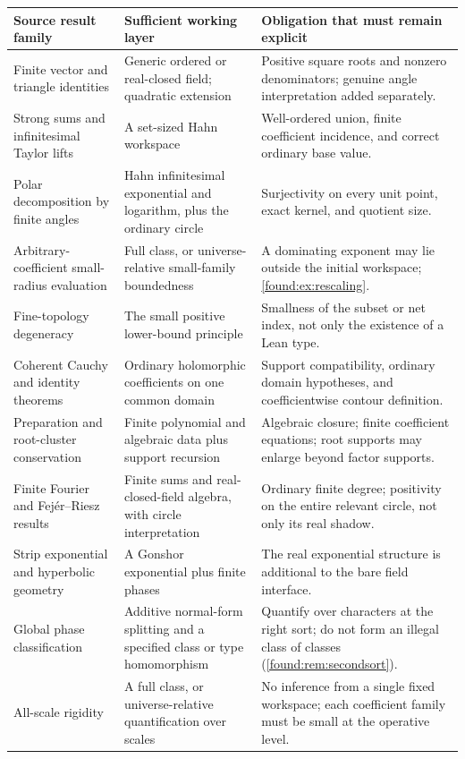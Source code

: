 \documentclass[11pt,letterpaper]{article}
\numberwithin{equation}{section}
\theoremstyle{definition}
\theoremstyle{remark}
\begin{document}
\begin{longtable}{@{}P{0.25\textwidth}P{0.32\textwidth}P{0.35\textwidth}@{}}
\toprule
Source result family & Sufficient working layer & Obligation that must remain explicit\\
\midrule\endhead
Finite vector and triangle identities & Generic ordered or real-closed field; quadratic extension & Positive square roots and nonzero denominators; genuine angle interpretation added separately.\\[0.4em]
Strong sums and infinitesimal Taylor lifts & A set-sized Hahn workspace & Well-ordered union, finite coefficient incidence, and correct ordinary base value.\\[0.4em]
Polar decomposition by finite angles & Hahn infinitesimal exponential and logarithm, plus the ordinary circle & Surjectivity on every unit point, exact kernel, and quotient size.\\[0.4em]
Arbitrary-coefficient small-radius evaluation & Full class, or universe-relative small-family boundedness & A dominating exponent may lie outside the initial workspace; \cref{found:ex:rescaling}.\\[0.4em]
Fine-topology degeneracy & The small positive lower-bound principle & Smallness of the subset or net index, not only the existence of a Lean type.\\[0.4em]
Coherent Cauchy and identity theorems & Ordinary holomorphic coefficients on one common domain & Support compatibility, ordinary domain hypotheses, and coefficientwise contour definition.\\[0.4em]
Preparation and root-cluster conservation & Finite polynomial and algebraic data plus support recursion & Algebraic closure; finite coefficient equations; root supports may enlarge beyond factor supports.\\[0.4em]
Finite Fourier and Fej\'er--Riesz results & Finite sums and real-closed-field algebra, with circle interpretation & Ordinary finite degree; positivity on the entire relevant circle, not only its real shadow.\\[0.4em]
Strip exponential and hyperbolic geometry & A Gonshor exponential plus finite phases & The real exponential structure is additional to the bare field interface.\\[0.4em]
Global phase classification & Additive normal-form splitting and a specified class or type homomorphism & Quantify over characters at the right sort; do not form an illegal class of classes (\cref{found:rem:secondsort}).\\[0.4em]
All-scale rigidity & A full class, or universe-relative quantification over scales & No inference from a single fixed workspace; each coefficient family must be small at the operative level.\\
\bottomrule
\end{longtable}
\end{document}

